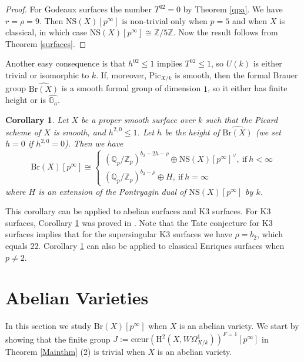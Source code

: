 \documentclass[a4paper,12pt,twoside]{report}
\newtheorem{corollary}[theorem]{Corollary}
\newcommand{\Q}{\mathbb{Q}}
\newcommand{\Z}{\mathbb{Z}}
\newcommand{\G}{\mathbb{G}}
\newcommand{\cris}{\mathrm{cris}}
\newcommand{\Pic}{\mathrm{Pic}}
\newcommand{\Br}{\mathrm{Br}}
\newcommand{\NS}{\mathrm{NS}}
\newcommand{\HH}{\mathrm{H}}
\begin{document}
\begin{proof}
     For Godeaux surfaces the number $T^{02}=0$ by Theorem \ref{qpa}. We have $r=\rho=9$. 
Then $\NS(X)[p^{\infty}]$ is non-trivial only when $p=5$ and when $X$ is classical, in which case $\NS(X)[p^{\infty}]\cong \Z/5\Z$. 
Now the result follows from Theorem \ref{surfaces}.
\end{proof} 

\medskip

Another easy consequence is that $h^{02}\leqslant 1$ implies $T^{02}\leqslant 1$, 
so $U(k)$ is either trivial or isomorphic to $k$. 
If, moreover, $\Pic_{X/k}$ is smooth, then the formal Brauer group $\widehat{\Br(X)}$ is a smooth formal group of dimension $1$, so it either has finite height or is $\widehat{\G_a}$. 

\begin{corollary}\label{NcSfs}
    Let $X$ be a proper smooth surface over $k$ such that the Picard scheme of $X$ is smooth, and 
    $h^{2,0}\leqslant 1$. Let $h$ be the height of $\widehat{\Br(X)}$ (we set $h=0$ if $h^{2,0}=0$).
    Then we have 
    \[\Br(X)[p^\infty]\cong\begin{cases}
        (\Q_p/\Z_p)^{b_2-2h-\rho} \oplus \NS(X)[p^{\infty}]^\vee, \ \text{if}\ h<\infty\\
        (\Q_p/\Z_p)^{b_2-\rho} \oplus H, \ \text{if}\ h=\infty
    \end{cases}\]
    where $H$ is an extension of the Pontryagin dual of $\NS(X)[p^{\infty}]$ by $k$. 
\end{corollary}

This corollary can be applied to abelian surfaces and K3 surfaces. 
For K3 surfaces, Corollary \ref{NcSfs} was proved in \cite{BY}.
Note that the Tate conjecture for K3 surfaces implies that for the supersingular K3 surfaces we have $\rho=b_2$, which equals $22$.
Corollary \ref{NcSfs} can also be applied to classical Enriques surfaces when $p\neq 2$. 


\section{Abelian Varieties}



In this section we study $\Br(X)[p^{\infty}]$ when $X$ is an abelian variety. We start by showing that the finite group 
$J:=\text{c\oe ur}(\HH^2(X,W\Omega^1_{X/k}))^{F=1}[p^{\infty}]$ 
in Theorem \ref{Mainthm} (2) is trivial when $X$ is an abelian variety. 
\end{document}
